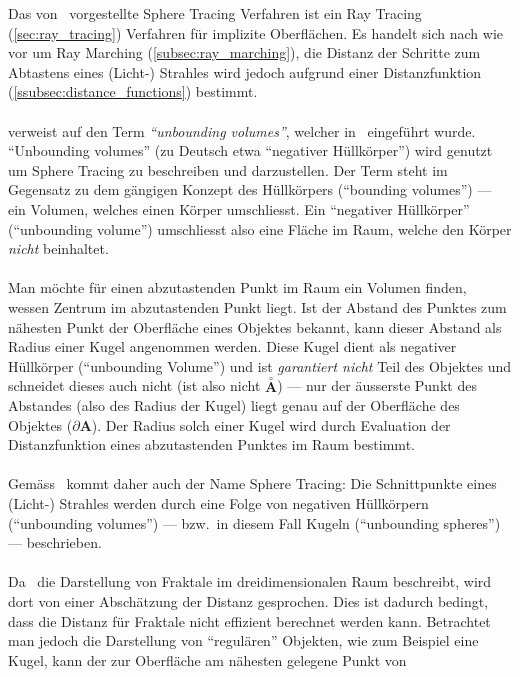 Das von~\cite{hart_sphere_1994} vorgestellte Sphere Tracing Verfahren ist ein
Ray Tracing (\ref{sec:ray_tracing}) Verfahren für implizite Oberflächen. Es
handelt sich nach wie vor um Ray Marching (\ref{subsec:ray_marching}), die
Distanz der Schritte zum Abtastens  eines (Licht-) Strahles wird jedoch
aufgrund einer Distanzfunktion (\ref{ssubsec:distance_functions}) bestimmt.\\
\\
\cite{hart_sphere_1994} verweist auf den Term \textit{``unbounding volumes''},
welcher in~\cite{hart_ray_1989} eingeführt wurde. ``Unbounding volumes'' (zu
Deutsch etwa ``negativer Hüllkörper'') wird genutzt um Sphere Tracing zu
beschreiben und darzustellen. Der Term steht im Gegensatz zu dem gängigen
Konzept des Hüllkörpers (``bounding volumes'') --- ein Volumen, welches einen
Körper umschliesst. Ein ``negativer Hüllkörper'' (``unbounding volume'')
umschliesst also eine Fläche im Raum, welche den Körper \textit{nicht}
beinhaltet.\\
\\
Man möchte für einen abzutastenden Punkt im Raum ein Volumen finden, wessen
Zentrum im abzutastenden Punkt liegt. Ist der Abstand des Punktes zum nähesten
Punkt der Oberfläche eines Objektes bekannt, kann dieser Abstand als Radius
einer Kugel angenommen werden. Diese Kugel dient als negativer Hüllkörper
(``unbounding Volume'') und ist \textit{garantiert nicht} Teil des Objektes und
schneidet dieses auch nicht (ist also nicht $\overset{\circ}{\bm{A}}$) --- nur
der äusserste Punkt des Abstandes (also des Radius der Kugel) liegt genau auf
der Oberfläche des Objektes ($\partial \bm{A}$). Der Radius solch einer Kugel
wird durch Evaluation der Distanzfunktion eines abzutastenden Punktes im Raum
bestimmt.\\
\\
Gemäss~\cite{hart_sphere_1994} kommt daher auch der Name Sphere Tracing: Die
Schnittpunkte eines (Licht-) Strahles werden durch eine Folge von negativen
Hüllkörpern (``unbounding volumes'') --- bzw.\ in diesem Fall Kugeln
(``unbounding spheres'') --- beschrieben.\\
\\
Da~\cite{hart_ray_1989} die Darstellung von Fraktale im dreidimensionalen Raum
beschreibt, wird dort von einer Abschätzung der Distanz gesprochen. Dies ist
dadurch bedingt, dass die Distanz für Fraktale nicht effizient berechnet werden
kann. Betrachtet man jedoch die Darstellung von  ``regulären'' Objekten, wie zum
Beispiel eine Kugel, kann der zur Oberfläche am nähesten gelegene Punkt von
